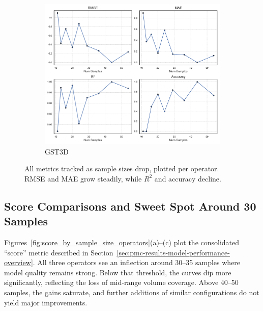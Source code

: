 \begin{figure}[htbp]
    \hfill
    \begin{subfigure}[t]{0.32\textwidth}
        \includegraphics[width=\textwidth]{assets/images/05/metrics_evolution_by_sample_size_gst3d}
        \caption{\ac{GST3D}}
    \end{subfigure}
    \caption{All metrics tracked as sample sizes drop, plotted per operator.
    \ac{RMSE} and \ac{MAE} grow steadily, while $R^2$ and accuracy decline.}
    \label{fig:metrics_evolution_sample_size_operators}
\end{figure}

\subsection{Score Comparisons and Sweet Spot Around 30 Samples}
\label{subsec:score-comparisons-and-sweet-spot}

Figures~\ref{fig:score_by_sample_size_operators}(a)–(c) plot the consolidated “score” metric described in Section~\ref{sec:pmc-results-model-performance-overview}.
All three operators see an inflection around 30–35 samples where model quality remains strong.
Below that threshold, the curves dip more significantly, reflecting the loss of mid-range volume coverage.
Above 40–50 samples, the gains saturate, and further additions of similar configurations do not yield major improvements.

